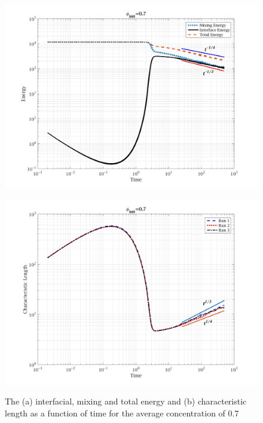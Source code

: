 \documentclass[a4paper,6pt]{article}
\begin{document}
\begin{figure}[H]
        \begin{minipage}[b]{.5\linewidth}        
                \centering
                \includegraphics[width=1\textwidth]{pics/E_c3.jpg}
                \subcaption{}
                	\label{E_c3}
        \end{minipage}
        \begin{minipage}[b]{.5\linewidth}
                \centering
                \includegraphics[width=1\textwidth]{pics/L_c3.jpg}
                \subcaption{}
                	\label{L_c3}
        \end{minipage}
                \caption{The (a) interfacial, mixing and total energy and (b) characteristic length as a function of time for the average concentration of 0.7}
        \label{EL_c3}
\end{figure}
\end{document}
